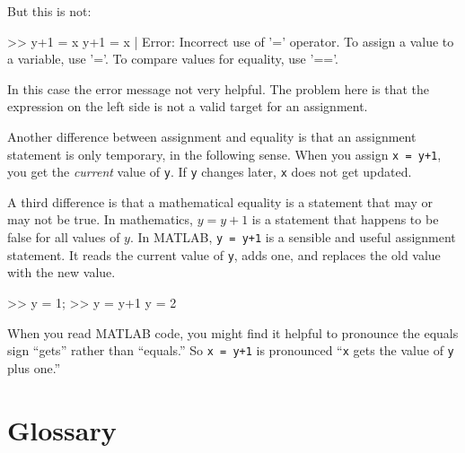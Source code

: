 \documentclass[
]{book}
\numberwithin{Answer}{chapter}
\numberwithin{Exercise}{chapter}
\begin{document}
But this is not:

\begin{code}
>> y+1 = x
 y+1 = x
     |
Error: Incorrect use of '=' operator. 
To assign a value to a variable, use '='. 
To compare values for equality, use '=='.
\end{code}

In this case the error message not very helpful.  The problem here is that the expression on the left side is not a valid target for an assignment.


Another difference between assignment and equality is that an assignment statement is only temporary, in the following sense.
When you assign {\tt x = y+1}, you get the
{\em current} value of {\tt y}.  If {\tt y} changes later, {\tt x}
does not get updated.

A third difference is that a mathematical equality is a statement that
may or may not be true.  In mathematics, $y = y+1$ is a statement that
happens to be false for all values of $y$.  
In MATLAB, {\tt y = y+1} is a sensible and useful assignment statement.
It reads the current value of {\tt y}, adds one, and replaces the old value with the new value.

\begin{code}
>> y = 1;
>> y = y+1
y = 2
\end{code}

When you read MATLAB code, you might find it helpful to pronounce
the equals sign ``gets'' rather than ``equals.''  So {\tt x = y+1}
is pronounced ``{\tt x} gets the value of {\tt y} plus one.''


\section{Glossary}
\end{document}
